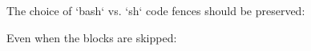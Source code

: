 The choice of `bash` vs. `sh` code fences should be preserved:



Even when the blocks are skipped:

\begin{bash}
\end{bash}

\begin{sh}
\end{sh}
